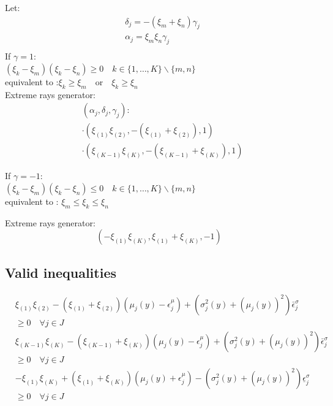 \documentclass{beamer}
\begin{document}
\begin{frame} Let:
	\begin{equation}
		\begin{aligned}
		& \delta_j= -(\xi_m+\xi_n)\gamma_j \\
		& \alpha_j=\xi_m\xi_n\gamma_j\\
		\end{aligned}
	\end{equation}
	If $\gamma=1$:\\
	\quad$(\xi_k - \xi_m)(\xi_k-\xi_n)\geq0 \quad k \in\{1, \ldots, K\} \backslash\{m, n\}$\\
	\quad equivalent to :$\xi_k\geq\xi_m \quad \text{or} \quad \xi_k\geq\xi_n$\\
	Extreme rays generator:
	\begin{equation}
		\begin{aligned}
		& \left(\alpha_j, \delta_j, \gamma_j\right): \\
		& \cdot\left(\xi_{(1)} \xi_{(2)},-\left(\xi_{(1)}+\xi_{(2)}\right), 1\right) \\
		& \cdot\left(\xi_{(K-1)} \xi_{(K)},-\left(\xi_{(K-1)}+\xi_{(K)}\right), 1\right)
		\end{aligned}
	\end{equation}


	If $\gamma=-1$:\\
	\quad$(\xi_k - \xi_m)(\xi_k-\xi_n)\leq0 \quad k \in\{1, \ldots, K\} \backslash\{m, n\}$\\
	\quad equivalent to : $\xi_m\leq\xi_k\leq\xi_n$
	
	Extreme rays generator:\\
	\begin{equation}
		\left(-\xi_{(1)} \xi_{(K)}, \xi_{(1)}+\xi_{(K)},-1\right)
	\end{equation}
\end{frame}	

\subsection{Valid inequalities}
\begin{frame}
	\begin{equation}
		\begin{aligned}
		& \xi_{(1)} \xi_{(2)}-\left(\xi_{(1)}+\xi_{(2)}\right)\left(\mu_j(y)-\epsilon_j^\mu\right)+\left(\sigma_j^2(y)+\left(\mu_j(y)\right)^2\right) \bar{\epsilon}_j^\sigma \\
		& \geq 0 \quad \forall j \in J \\
		& \xi_{(K-1)} \xi_{(K)}-\left(\xi_{(K-1)}+\xi_{(K)}\right)\left(\mu_j(y)-\epsilon_j^\mu\right)+\left(\sigma_j^2(y)+\left(\mu_j(y)\right)^2\right) \bar{\epsilon}_j^\sigma \\
		& \geq 0 \quad \forall j \in J \\
		& -\xi_{(1)} \xi_{(K)}+\left(\xi_{(1)}+\xi_{(K)}\right)\left(\mu_j(y)+\epsilon_j^\mu\right)-\left(\sigma_j^2(y)+\left(\mu_j(y)\right)^2\right) \underline{\epsilon}_j^\sigma \\
		& \geq 0 \quad \forall j \in J
		\end{aligned}
	\end{equation}
\end{frame}	
\end{document}
